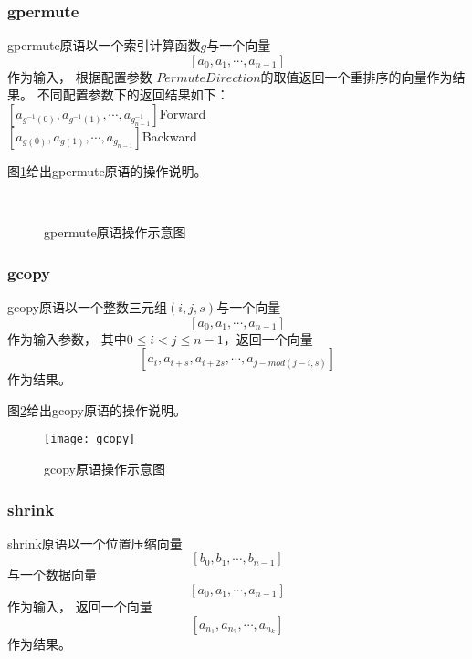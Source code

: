 \subsubsection{gpermute}
\begin{definition}
  gpermute原语以一个索引计算函数$g$与一个向量$$[a_0, a_1, \cdots, a_{n-1}]$$作为输入，
  根据配置参数  $PermuteDirection$的取值返回一个重排序的向量作为结果。
  不同配置参数下的返回结果如下：\\
  $[a_{g^{-1}(0)}, a_{g^{-1}(1)}, \cdots, a_{g^{-1}_{n-1}}]$\hfill{}Forward\\
  $[a_{g(0)}, a_{g(1)}, \cdots, a_{g_{n-1}}]$\hfill{}Backward\\  
\end{definition}

图\ref{fig:gpermute-diagram}给出gpermute原语的操作说明。
\begin{figure}[h]
  \centering
  \\
  \caption{gpermute原语操作示意图}
  \label{fig:gpermute-diagram}
\end{figure}

\subsubsection{gcopy}
\begin{definition}
  gcopy原语以一个整数三元组$(i, j, s)$与一个向量$$[a_0, a_1, \cdots, a_{n-1}]$$作为输入参数，
  其中$0\le{}i<j\le{}n-1$，返回一个向量$$[a_{i}, a_{i+s}, a_{i+2s}, \cdots, a_{j-mod(j-i,s)}]$$作为结果。
\end{definition}

图\ref{fig:gcopy-diagram}给出gcopy原语的操作说明。
\begin{figure}[h]
  \centering
  \texttt{[image: gcopy]}
  \caption{gcopy原语操作示意图}
  \label{fig:gcopy-diagram}
\end{figure}

\subsubsection{shrink}
\begin{definition}
  shrink原语以一个位置压缩向量$$[b_0, b_1, \cdots, b_{n-1}]$$与一个数据向量$$[a_0, a_1, \cdots, a_{n-1}]$$作为输入，
  返回一个向量$$[a_{n_1}, a_{n_2}, \cdots, a_{n_k}]$$作为结果。
\end{definition}


